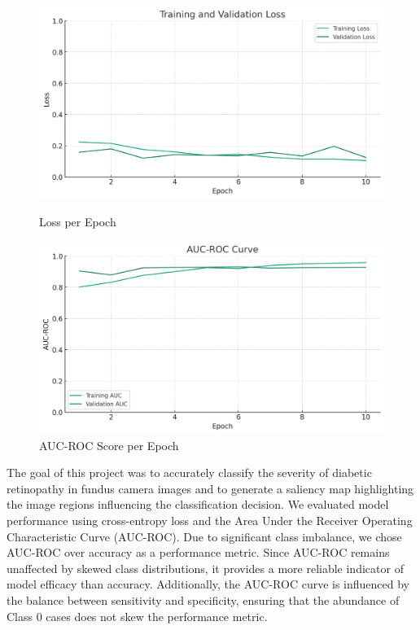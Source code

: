 \begin{figure}[h]
  \centering
  \begin{minipage}{.5\textwidth}
    \centering
    \includegraphics[scale=0.4]{Images/Loss.jpg}
    \caption{Loss per Epoch}
    \label{fig:loss}
  \end{minipage}%
  \begin{minipage}{.5\textwidth}
    \centering
    \includegraphics[scale=0.4]{Images/AUC-ROC.jpg}
    \caption{AUC-ROC Score per Epoch}
    \label{fig:auc-roc}
  \end{minipage}
\end{figure}

The goal of this project was to accurately classify the severity of diabetic retinopathy in fundus camera images and to generate a saliency map highlighting the image regions influencing the classification decision. We evaluated model performance using cross-entropy loss and the Area Under the Receiver Operating Characteristic Curve (AUC-ROC). Due to significant class imbalance, we chose AUC-ROC over accuracy as a performance metric. Since AUC-ROC remains unaffected by skewed class distributions, it provides a more reliable indicator of model efficacy than accuracy. Additionally, the AUC-ROC curve is influenced by the balance between sensitivity and specificity, ensuring that the abundance of Class 0 cases does not skew the performance metric.

